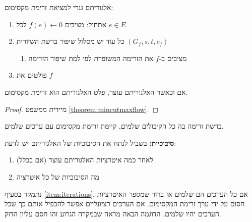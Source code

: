 אלגוריתם גנרי למציאת זרימת מקסימום:

\begin{enumerate}
\item
אתחול: מציבים 
$f(e) \leftarrow 0$
לכל
$e \in E$

\item
כל עוד יש מסלול שיפור ברשת השיורית
$(G_f, s, t, c_f)$
\begin{enumerate}
\item
מציבים ב-$f$ את הזרימה המשופרת לפי למת שיפור הזרימה
\end{enumerate}
\item
פולטים את $f$
\end{enumerate}

\begin{claim}
אם וכאשר האלגוריתם עוצר, פלט האלגוריתם הוא זרימת מקסימום.
\end{claim}

\begin{proof}
מיידית ממשפט
\ref{theorem:mincutmaxflow}.
\end{proof}

\begin{corollary}
ברשת זרימה בה כל הקיבולים שלמים, קיימת זרימת מקסימום עם ערכים שלמים.
\end{corollary}

\textbf{סיבוכיות:}
בשביל לנתח את הסיבוכיות של האלגוריתם יש לדעת:
\begin{enumerate}
\item
\label{item:iterations}
לאחר כמה איטרציות האלגוריתם עוצר (אם בכלל)
\item
מה הסיבוכיות של כל איטרציה
\end{enumerate}

נתמקד בסעיף
\ref{item:iterations}.
אם כל הערכים הם שלמים אז ברור שמספר האיטרציות חסום על ידי ערך זרימת המקסימום. 
אם הערכים רציונליים אפשר להכפיל אותם כך שכל הערכים יהיו שלמים.
הדוגמה הבאה מראה שבמקרה הגרוע זהו חסם עליון הדוק.

